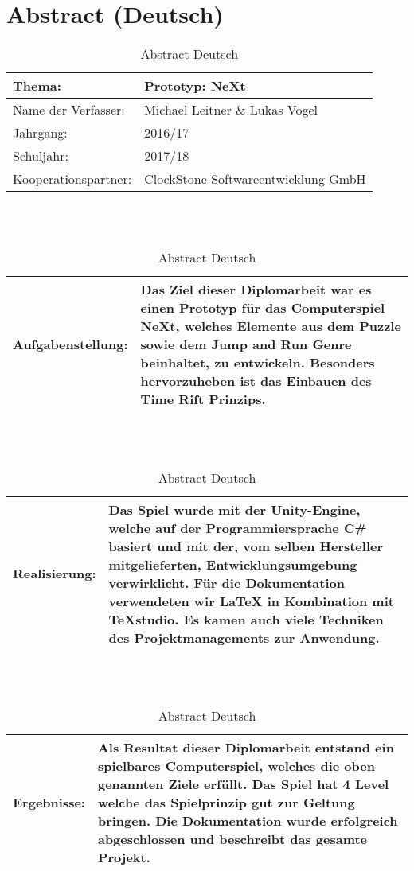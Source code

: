 \chapter*{Abstract (Deutsch)}
\def \currentAuthor {Lukas Vogel}
\begin{table}[H]
	
	\renewcommand{\arraystretch}{1.5}
\begin{tabular}{|p{4cm}|p{10cm}|}
	\hline 
	Thema: &  Prototyp: NeXt\\ 
	\hline
	 Name der Verfasser: & Michael Leitner \& Lukas Vogel  \\ 
	\hline 
	Jahrgang: & 2016/17 \\
	\hline
	 Schuljahr: & 2017/18 \\
	\hline 
	Kooperationspartner: & ClockStone Softwareentwicklung GmbH\\
	\hline
\end{tabular}
\ \\
\ \\
\begin{tabular}{|p{4cm}|p{10cm}|}
	\hline
	Aufgabenstellung: & Das Ziel dieser Diplomarbeit war es einen Prototyp für das Computerspiel NeXt, welches Elemente aus dem Puzzle sowie dem Jump and Run Genre beinhaltet, zu entwickeln. Besonders hervorzuheben ist das Einbauen des Time Rift Prinzips. \\
	\hline
\end{tabular} 
\ \\
\ \\
\begin{tabular}{|p{4cm}|p{10cm}|}
	\hline
	Realisierung: & Das Spiel wurde mit der Unity-Engine, welche auf der Programmiersprache C# basiert und mit der, vom selben Hersteller mitgelieferten, Entwicklungsumgebung verwirklicht. Für die Dokumentation verwendeten wir LaTeX in Kombination mit TeXstudio. Es kamen auch viele Techniken des Projektmanagements zur Anwendung.\\
	\hline
\end{tabular}
\ \\
\ \\
\begin{tabular}{|p{4cm}|p{10cm}|}
	\hline
	Ergebnisse: & Als Resultat dieser Diplomarbeit entstand ein spielbares Computerspiel, welches die oben genannten Ziele erfüllt. Das Spiel hat 4 Level welche das Spielprinzip gut zur Geltung bringen. Die Dokumentation wurde erfolgreich abgeschlossen und beschreibt das gesamte Projekt. \\
	\hline
\end{tabular}
\caption{Abstract Deutsch}
\end{table}
